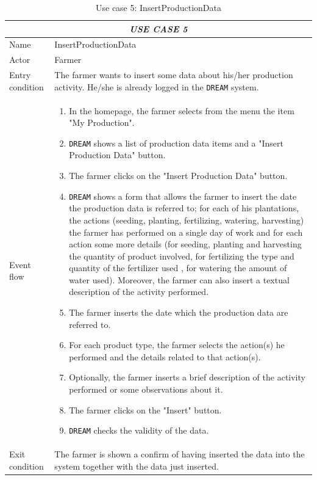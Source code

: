 \documentclass{article}
\begin{document}
\centering
\begin{longtable}{|p{3.5cm}|m{8cm}|}
\caption{Use case 5: InsertProductionData}
 \label{uc5}
 \hline
 \multicolumn{2}{|c|}{\cellcolor{white}\emph{USE CASE 5}} \\
 \endfirsthead
 \endhead
 \endfoot
 \endlastfoot
 \hline
 Name & InsertProductionData\\
 \hline
 Actor & Farmer\\
 \hline
 Entry condition & The farmer wants to insert some data about his/her production activity. He/she is already logged in the \verb|DREAM| system.\\
 \hline
 Event flow & \begin{enumerate}
    \item In the homepage, the farmer selects from the menu the item "My Production".
    \item \verb|DREAM| shows a list of production data items and a "Insert Production Data" button.
    \item The farmer clicks on the "Insert Production Data" button.
    \item \verb|DREAM| shows a form that allows the farmer to insert the date the production data is referred to; for each of his plantations, the actions (seeding, planting, fertilizing, watering, harvesting) the farmer has performed on a single day of work and for each action some more details (for seeding, planting and harvesting the quantity of product involved, for fertilizing the type and quantity of the fertilizer used , for watering the amount of water used). Moreover, the farmer can also insert a textual description of the activity performed.
    \item The farmer inserts the date which the production data are referred to.
    \item For each product type, the farmer selects the action(s) he performed and the details related to that action(s).
    \item Optionally, the farmer inserts a brief description of the activity performed or some observations about it.
    \item The farmer clicks on the "Insert" button.
    \item \verb|DREAM| checks the validity of the data.
    \color{black}
 \end{enumerate}\\
 \hline
 Exit condition & The farmer is shown a confirm of having inserted the data into the system together with the data just inserted.\\

\end{longtable}
\end{document}
